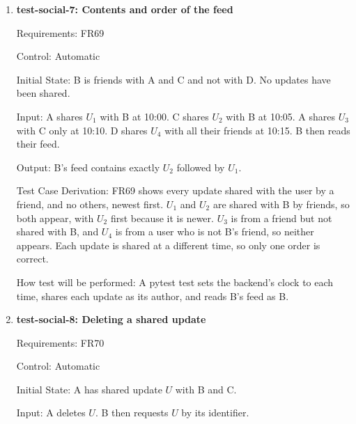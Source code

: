 \documentclass[12pt, titlepage]{article}
\begin{document}
\begin{enumerate}
Output: A preview is shown before every update is shared. Each update in B's
feed shows the same values and text as its preview. The cancelled update does
not appear in B's feed.

Test Case Derivation: The fit criterion of FR67 is that for every update the
preview matches what the selected friends see, so each of the four kinds is
checked on B's own device. Cancelling at the preview checks that the preview
comes before sharing, since an update shared before its preview would already
be in B's feed.

How test will be performed: The tester compares each screenshot with the
matching update on B's device and records any difference.

\item{\textbf{test-social-7: Contents and order of the feed}\\}

Requirements: FR69

Control: Automatic

Initial State: B is friends with A and C and not with D. No updates have been
shared.

Input: A shares $U_1$ with B at 10:00. C shares $U_2$ with B at 10:05. A shares
$U_3$ with C only at 10:10. D shares $U_4$ with all their friends at 10:15. B
then reads their feed.

Output: B's feed contains exactly $U_2$ followed by $U_1$.

Test Case Derivation: FR69 shows every update shared with the user by a
friend, and no others, newest first. $U_1$ and $U_2$ are shared with B by
friends, so both appear, with $U_2$ first because it is newer. $U_3$ is from a
friend but not shared with B, and $U_4$ is from a user who is not B's friend,
so neither appears. Each update is shared at a different time, so only one
order is correct.

How test will be performed: A pytest test sets the backend's clock to each
time, shares each update as its author, and reads B's feed as B.

\item{\textbf{test-social-8: Deleting a shared update}\\}

Requirements: FR70

Control: Automatic

Initial State: A has shared update $U$ with B and C.

Input: A deletes $U$. B then requests $U$ by its identifier.


\end{enumerate}
\end{document}
